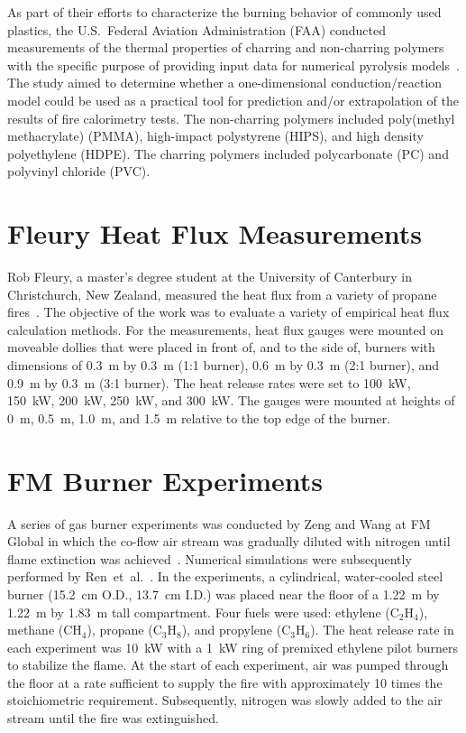As part of their efforts to characterize the burning behavior of commonly used plastics, the U.S.~Federal Aviation Administration (FAA) conducted measurements of the thermal properties of charring and non-charring polymers with the specific purpose of providing input data for numerical pyrolysis models~\cite{Stoliarov:CF2009,Stoliarov:CF2010}. The study aimed to determine whether a one-dimensional conduction/reaction model could be used as a practical tool for prediction and/or extrapolation of the results of fire calorimetry tests. The non-charring polymers included poly(methyl methacrylate) (PMMA), high-impact polystyrene (HIPS), and high density polyethylene (HDPE). The charring polymers included polycarbonate (PC) and polyvinyl chloride (PVC).


\section{Fleury Heat Flux Measurements}
\label{Fleury_Heat_Flux_Description}

Rob Fleury, a master's degree student at the University of Canterbury in Christchurch, New Zealand, measured the heat flux from a variety of propane fires~\cite{Fleury:Masters}. The objective of the work was to evaluate a variety of empirical heat flux calculation methods. For the measurements, heat flux gauges were mounted on moveable dollies that were placed in front of, and to the side of, burners with dimensions of 0.3~m by 0.3~m (1:1 burner), 0.6~m by 0.3~m (2:1 burner), and 0.9~m by 0.3~m (3:1 burner). The heat release rates were set to 100~kW, 150~kW, 200~kW, 250~kW, and 300~kW. The gauges were mounted at heights of 0~m, 0.5~m, 1.0~m, and 1.5~m relative to the top edge of the burner.


\section{FM Burner Experiments}
\label{FM_Burner_Description}

A series of gas burner experiments was conducted by Zeng and Wang at FM Global in which the co-flow air stream was gradually diluted with nitrogen until flame extinction was achieved~\cite{Zeng:26ICDERS}. Numerical simulations were subsequently performed by Ren~et~al.~\cite{Ren:CS2018}. In the experiments, a cylindrical, water-cooled steel burner (15.2~cm O.D., 13.7~cm I.D.) was placed near the floor of a 1.22~m by 1.22~m by 1.83~m tall compartment. Four fuels were used: ethylene (C$_2$H$_4$), methane (CH$_4$), propane (C$_3$H$_8$), and propylene (C$_3$H$_6$). The heat release rate in each experiment was 10~kW with a 1~kW ring of premixed ethylene pilot burners to stabilize the flame. At the start of each experiment, air was pumped through the floor at a rate sufficient to supply the fire with approximately 10 times the stoichiometric requirement. Subsequently, nitrogen was slowly added to the air stream until the fire was extinguished.

